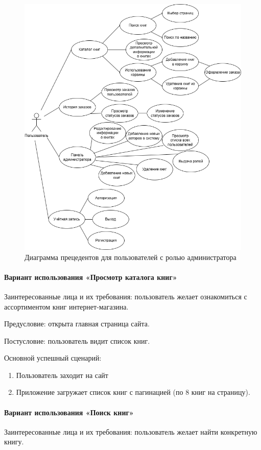 \begin{figure}[H]
	\centering
	\includegraphics[width=0.7\linewidth]{"images/Администраторы"}
	\caption{Диаграмма прецедентов для пользователей с ролью администратора}
	\label{fig:--}
\end{figure}


\paragraph{Вариант использования «Просмотр каталога книг»}

Заинтересованные лица и их требования: пользователь желает ознакомиться с ассортиментом книг интернет-магазина.

Предусловие: открыта главная страница сайта.

Постусловие: пользователь видит список книг.

Основной успешный сценарий:

\begin{enumerate}
	\item Пользователь заходит на сайт
	\item Приложение загружает список книг с пагинацией (по 8 книг на страницу).
\end{enumerate}


\paragraph{Вариант использования «Поиск книг»}

Заинтересованные лица и их требования: пользователь желает найти конкретную книгу.

